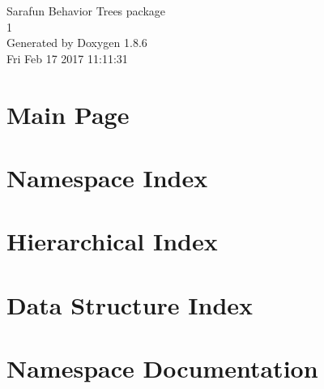 \documentclass[twoside]{book}
\newcommand{\clearemptydoublepage}{%
  \newpage{\pagestyle{empty}\cleardoublepage}%
}
\begin{document}
\hypersetup{pageanchor=false}
\begin{titlepage}
\vspace*{7cm}
\begin{center}%
{\Large Sarafun Behavior Trees package \\[1ex]\large 1 }\\
\vspace*{1cm}
{\large Generated by Doxygen 1.8.6}\\
\vspace*{0.5cm}
{\small Fri Feb 17 2017 11:11:31}\\
\end{center}
\end{titlepage}
\clearemptydoublepage
\tableofcontents
\clearemptydoublepage
{}
\hypersetup{pageanchor=true}

\chapter{Main Page}
\label{index}\hypertarget{index}{}
\chapter{Namespace Index}

\chapter{Hierarchical Index}

\chapter{Data Structure Index}

\chapter{Namespace Documentation}



\end{document}
